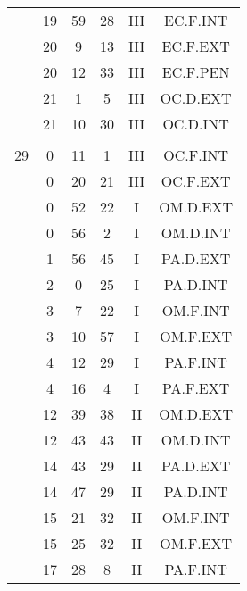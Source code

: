 \documentclass[12pt, a4paper]{article}
\begin{document}
\begin{multicols}{3}
{\begin{tabular}{c c c c c c}
	 	 	 	 & 19 & 59 & 28 & III & EC.F.INT\\%
	 	 	 	 & 20 & 9 & 13 & III & EC.F.EXT\\%
	 	 	 	 & 20 & 12 & 33 & III & EC.F.PEN\\%
	 	 	 	 & 21 & 1 & 5 & III & OC.D.EXT\\%
	 	 	 	 & 21 & 10 & 30 & III & OC.D.INT\\%
	 	 	 	 & & & & & \\%
	 	 	 	29 & 0 & 11 & 1 & III & OC.F.INT\\%
	 	 	 	 & 0 & 20 & 21 & III & OC.F.EXT\\%
	 	 	 	 & 0 & 52 & 22 & I & OM.D.EXT\\%
	 	 	 	 & 0 & 56 & 2 & I & OM.D.INT\\%
	 	 	 	 & 1 & 56 & 45 & I & PA.D.EXT\\%
	 	 	 	 & 2 & 0 & 25 & I & PA.D.INT\\%
	 	 	 	 & 3 & 7 & 22 & I & OM.F.INT\\%
	 	 	 	 & 3 & 10 & 57 & I & OM.F.EXT\\%
	 	 	 	 & 4 & 12 & 29 & I & PA.F.INT\\%
	 	 	 	 & 4 & 16 & 4 & I & PA.F.EXT\\%
	 	 	 	 & 12 & 39 & 38 & II & OM.D.EXT\\%
	 	 	 	 & 12 & 43 & 43 & II & OM.D.INT\\%
	 	 	 	 & 14 & 43 & 29 & II & PA.D.EXT\\%
	 	 	 	 & 14 & 47 & 29 & II & PA.D.INT\\%
	 	 	 	 & 15 & 21 & 32 & II & OM.F.INT\\%
	 	 	 	 & 15 & 25 & 32 & II & OM.F.EXT\\%
	 	 	 	 & 17 & 28 & 8 & II & PA.F.INT\\%

\end{tabular}}
\end{multicols}
\end{document}
